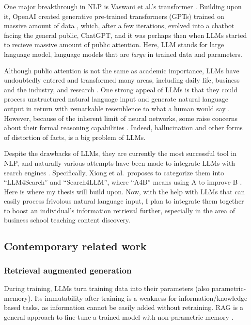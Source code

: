 \documentclass[final-report]{report-template}
\begin{document}
One major breakthrough in NLP is Vaswani et al.'s transformer \cite{transformer}. 
Building upon it, OpenAI created generative pre-trained transformers (GPTs)
trained on massive amount of data \cite{gpt1}, which, after a few iterations,
evolved into a chatbot facing the general public, ChatGPT, and it was perhaps
then when LLMs started to recieve massive amount of public attention. Here, LLM
stands for large language model, language models that are \emph{large} in
trained data and parameters.

Although public attention is not the same as academic importance, LLMs
have undoubtedly entered and transformed many areas, including daily life,
business and the industry, and research \cite{llm.impact.1}. One strong appeal
of LLMs is that they could process unstructured natural language input and generate
natural language output in return with remarkable resemblence to what a human
would say \cite{llm.power.1, llm.power.2}. However, because of the inherent
limit of neural networks, some raise concerns about their formal reasoning
capabilities \cite{llm.limit.1, llm.limit.2, llm.limit.3}. Indeed,
hallucination \cite{llm.hallucination.1, llm.hallucination.2} and other forms
of distortion of facts, is a big problem of LLMs.

Despite the drawbacks of LLMs, they are currently the most successful tool in
NLP, and naturally various attempts have been made to integrate LLMs with search
engines \cite{llm.meet.search.1, llm.meet.search.2, llm.meet.search.3}.
Specifically, Xiong et al.\ proposes to categorize them into ``LLM4Search'' and
``Search4LLM'', where ``A4B'' means using A to improve B
\cite{llm.meet.search.1}. Here is where my thesis will build upon.  Now, with
the help with LLMs that can easily process frivolous natural language input, I
plan to integrate them together to boost an individual's information retrieval
further, especially in the area of business school teaching content discovery.

\subsection{Contemporary related work} \label{sec.related.work}
\subsubsection{Retrieval augmented generation}
During training, LLMs turn training data into their parameters (also
parametric-memory). Its immutability after training is a
weakness for information/knowledge based tasks, as information
cannot be easily added without retraining. RAG is a general approach to
fine-tune a trained model with non-parametric memory \cite{rag}. 
\end{document}
